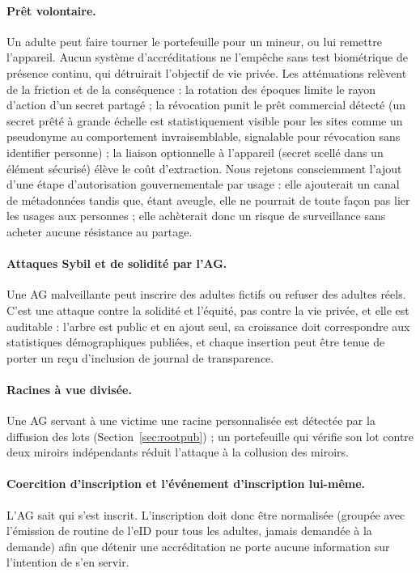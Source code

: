 \documentclass[11pt]{article}
\theoremstyle{definition}
\begin{document}
\paragraph{Prêt volontaire.} Un adulte peut faire tourner le portefeuille pour un mineur,
ou lui remettre l'appareil. Aucun système d'accréditations ne l'empêche sans test
biométrique de présence continu, qui détruirait l'objectif de vie privée. Les atténuations
relèvent de la friction et de la conséquence : la rotation des époques limite le rayon
d'action d'un secret partagé ; la révocation punit le prêt commercial détecté (un secret
prêté à grande échelle est statistiquement visible pour les sites comme un pseudonyme au
comportement invraisemblable, signalable pour révocation sans identifier personne) ; la
liaison optionnelle à l'appareil (secret scellé dans un élément sécurisé) élève le coût
d'extraction. Nous rejetons consciemment l'ajout d'une étape d'autorisation
gouvernementale par usage : elle ajouterait un canal de métadonnées tandis que, étant
aveugle, elle ne pourrait de toute façon pas lier les usages aux personnes ; elle
achèterait donc un risque de surveillance sans acheter aucune résistance au partage.

\paragraph{Attaques Sybil et de solidité par l'AG.} Une AG malveillante peut inscrire des
adultes fictifs ou refuser des adultes réels. C'est une attaque contre la solidité et
l'équité, pas contre la vie privée, et elle est auditable : l'arbre est public et en ajout
seul, sa croissance doit correspondre aux statistiques démographiques publiées, et chaque
insertion peut être tenue de porter un reçu d'inclusion de journal de transparence.

\paragraph{Racines à vue divisée.} Une AG servant à une victime une racine personnalisée
est détectée par la diffusion des lots (Section~\ref{sec:rootpub}) ; un portefeuille qui
vérifie son lot contre deux miroirs indépendants réduit l'attaque à la collusion des
miroirs.

\paragraph{Coercition d'inscription et l'événement d'inscription lui-même.} L'AG sait qui
s'est inscrit. L'inscription doit donc être normalisée (groupée avec l'émission de routine
de l'eID pour tous les adultes, jamais demandée à la demande) afin que détenir une
accréditation ne porte aucune information sur l'intention de s'en servir.
\end{document}
